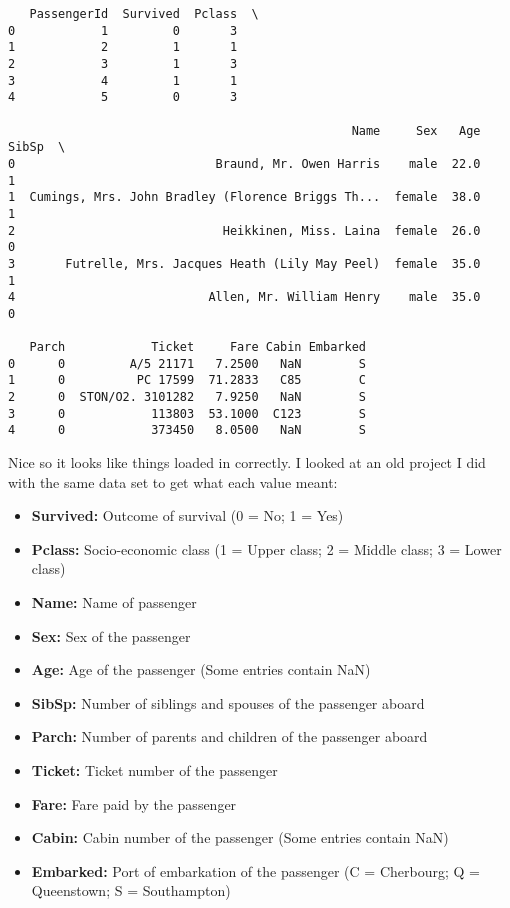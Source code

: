 \documentclass[11pt]{article}
\providecommand{\tightlist}{%
      \setlength{\itemsep}{0pt}\setlength{\parskip}{0pt}}
\begin{document}
    
    \begin{verbatim}
   PassengerId  Survived  Pclass  \
0            1         0       3   
1            2         1       1   
2            3         1       3   
3            4         1       1   
4            5         0       3   

                                                Name     Sex   Age  SibSp  \
0                            Braund, Mr. Owen Harris    male  22.0      1   
1  Cumings, Mrs. John Bradley (Florence Briggs Th...  female  38.0      1   
2                             Heikkinen, Miss. Laina  female  26.0      0   
3       Futrelle, Mrs. Jacques Heath (Lily May Peel)  female  35.0      1   
4                           Allen, Mr. William Henry    male  35.0      0   

   Parch            Ticket     Fare Cabin Embarked  
0      0         A/5 21171   7.2500   NaN        S  
1      0          PC 17599  71.2833   C85        C  
2      0  STON/O2. 3101282   7.9250   NaN        S  
3      0            113803  53.1000  C123        S  
4      0            373450   8.0500   NaN        S  
    \end{verbatim}

    
    Nice so it looks like things loaded in correctly. I looked at an old
project I did with the same data set to get what each value meant:

\begin{itemize}
\tightlist
\item
  \textbf{Survived:} Outcome of survival (0 = No; 1 = Yes)
\item
  \textbf{Pclass:} Socio-economic class (1 = Upper class; 2 = Middle
  class; 3 = Lower class)
\item
  \textbf{Name:} Name of passenger
\item
  \textbf{Sex:} Sex of the passenger
\item
  \textbf{Age:} Age of the passenger (Some entries contain NaN)
\item
  \textbf{SibSp:} Number of siblings and spouses of the passenger aboard
\item
  \textbf{Parch:} Number of parents and children of the passenger aboard
\item
  \textbf{Ticket:} Ticket number of the passenger
\item
  \textbf{Fare:} Fare paid by the passenger
\item
  \textbf{Cabin:} Cabin number of the passenger (Some entries contain
  NaN)
\item
  \textbf{Embarked:} Port of embarkation of the passenger (C =
  Cherbourg; Q = Queenstown; S = Southampton)
\end{itemize}
\end{document}
